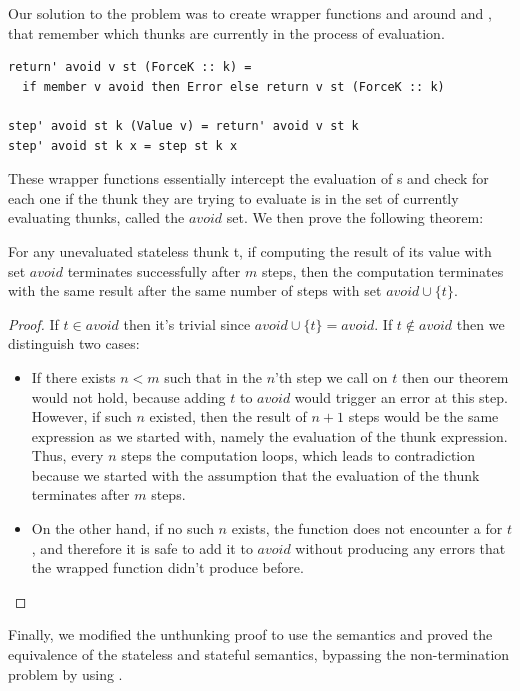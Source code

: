 Our solution to the problem was to create wrapper functions  and
 around  and , that remember which
thunks are currently in the process of evaluation.
\begin{verbatim}
return' avoid v st (ForceK :: k) =
  if member v avoid then Error else return v st (ForceK :: k)

step' avoid st k (Value v) = return' avoid v st k
step' avoid st k x = step st k x
\end{verbatim}
These wrapper functions essentially intercept the evaluation of s and
check for each one if the thunk they are trying to evaluate is in the set of
currently evaluating thunks, called the $avoid$ set. We then prove the
following theorem:
\begin{theorem} For any unevaluated stateless thunk t, if
  computing the result of its value with set $avoid$ terminates
  successfully after $m$ steps, then the computation terminates with the same
  result after the same number of steps with set $avoid \cup \{t\}$.
\end{theorem}
\renewcommand*{\proofname}{Proof outline}
\begin{proof}
  If $t \in avoid$ then it's trivial since $avoid \cup \{t\} = avoid$.
  If $t \notin avoid$ then we distinguish two cases:
  \begin{itemize}
    \item If there exists $n < m$ such that in the $n$'th step we call
       on $t$ then our theorem would not hold, because adding $t$ to
      $avoid$ would trigger an error at this step. However, if such $n$ existed,
      then the result of $n+1$ steps would be the same expression as we started
      with, namely the evaluation of the thunk expression. Thus, every $n$ steps
      the computation loops, which leads to contradiction because we started
      with the assumption that the evaluation of the thunk terminates after $m$
      steps.
    \item On the other hand, if no such $n$ exists, the  function
      does not encounter a  for $t$, and therefore it is safe to add
      it to $avoid$ without producing any errors that the wrapped 
      function didn't produce before.
  \end{itemize}
\end{proof}

Finally, we modified the unthunking proof to use the  semantics and
proved the equivalence of the stateless and stateful semantics, bypassing the
non-termination problem by using .

